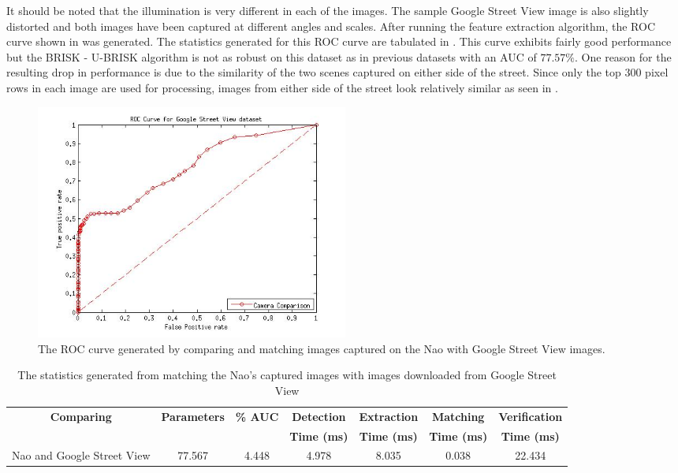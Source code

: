 \documentclass[11pt]{report}
\begin{document}
It should be noted that the illumination is very different in each of the images. The sample Google Street View image is also slightly distorted and both images have been captured at different angles and scales. After running the feature extraction algorithm, the ROC curve shown in  was generated. The statistics generated for this ROC curve are tabulated in . This curve exhibits fairly good performance but the BRISK - U-BRISK algorithm is not as robust on this dataset as in previous datasets with an AUC of $77.57\%$. One reason for the resulting drop in performance is due to the similarity of the two scenes captured on either side of the street. Since only the top $300$ pixel rows in each image are used for processing, images from either side of the street look relatively similar as seen in .\\

 \begin{figure}[h!] 
  \centering
    \includegraphics[width=0.5\textwidth]{../Drawings/streetView/ROC_StreetView.jpg}
    \caption{The ROC curve generated by comparing and matching images captured on the Nao with Google Street View images.}
    \label{fig:rocGoogleStreet}
\end{figure}

\begin{table}
\caption{The statistics generated from matching the Nao's captured images with
images downloaded from Google Street View}
\footnotesize
\begin{tabular}{|c|c|c|c|c|c|c|}
\hline 
\textbf{Comparing} & \textbf{Parameters} & \textbf{\% AUC} & \textbf{Detection} & \textbf{Extraction} & \textbf{Matching} & \textbf{Verification}\tabularnewline
 &  &  & \textbf{Time (ms)} & \textbf{Time (ms)} & \textbf{Time (ms)} & \textbf{Time (ms)}\tabularnewline
\hline 
\hline 
Nao and Google Street View & 77.567 & 4.448 & 4.978 & 8.035 & 0.038 & 22.434\tabularnewline
\hline 
\end{tabular}
\label{tab:naoGoogleStreetRoc}
\end{table}
\end{document}

